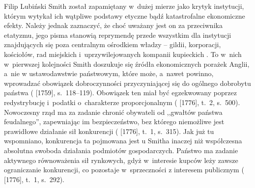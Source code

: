 \begin{artplenv}{Filip Lubiński}
Smith został zapamiętany w~dużej mierze jako krytyk instytucji, którym wytykał ich wątpliwe podstawy etyczne bądź
katastrofalne ekonomiczne efekty. Należy jednak zaznaczyć, że choć uważany jest on za przeciwnika etatyzmu, jego pisma
stanowią reprymendę przede wszystkim dla instytucji znajdujących się poza centralnym ośrodkiem władzy -- gildii,
korporacji, kościołów, rad miejskich i~uprzywilejowanych kompanii kupieckich
\parencite[s.~108]{rothschild_economic_2002}.
To w~nich w~pierwszej kolejności Smith doszukuje się źródła ekonomicznych porażek Anglii, a~nie w
ustawodawstwie państwowym, które może, a~nawet powinno, wprowadzać obowiązek dobroczynności przyczyniającej się do
ogólnego dobrobytu państwa
(\cite{smith_teoria_1989} [1759], s.~118--119).
Obowiązek ten miał być
egzekwowany poprzez redystrybucję i~podatki o~charakterze proporcjonalnym
(\cite{smith_badania_2007} [1776], t.~2, s.~500).
Nowoczesny rząd ma za zadanie chronić obywateli od ,,gwałtów państwa
feudalnego'', zapewniając im bezpieczeństwo, bez którego niemożliwe jest prawidłowe działanie sił konkurencji
(\cite{smith_badania_2007} [1776], t.~1, s.~315).
Jak już tu wspomniano, konkurencja ta pojmowana jest u
Smitha inaczej niż współczesna absolutna swoboda działania podmiotów gospodarczych. Państwo ma zadanie aktywnego
równoważenia sił rynkowych, gdyż w~interesie kupców leży zawsze ograniczanie konkurencji, co pozostaje w~sprzeczności z
interesem publicznym
(\cite{smith_badania_2007} [1776], t.~1, s.~292).


\end{artplenv}
